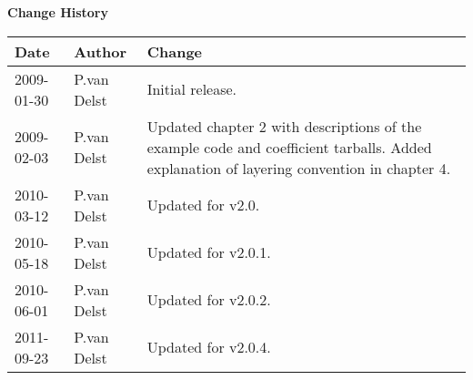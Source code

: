
\thispagestyle{empty}
\vspace*{10cm}
\begin{center}
  {\sffamily\Large\bfseries Change History}
  \begin{table}[htp]
    \centering
    \begin{tabular}{|p{2cm}|p{3cm}|p{8cm}|}
      \hline
      \sffamily\textbf{Date} & \sffamily\textbf{Author} & \sffamily\textbf{Change}\\
      \hline\hline
      2009-01-30 & P.van Delst & Initial release.\\
      \hline
      2009-02-03 & P.van Delst & Updated chapter 2 with descriptions of the example code and coefficient tarballs. Added explanation of layering convention in chapter 4.\\
      \hline
      2010-03-12 & P.van Delst & Updated for v2.0.\\
      \hline
      2010-05-18 & P.van Delst & Updated for v2.0.1.\\
      \hline
      2010-06-01 & P.van Delst & Updated for v2.0.2.\\
      \hline
      2011-09-23 & P.van Delst & Updated for v2.0.4.\\
      \hline
    \end{tabular}
  \end{table}
\end{center}
\clearpage

\setcounter{page}{1}
  \tableofcontents\newpage
  \listoffigures\newpage
  \listoftables\newpage
  
  
  
  
\setcounter{page}{1}









\clearpage
{}
{}




\begin{appendix}
  
  
  
%  
\end{appendix}



